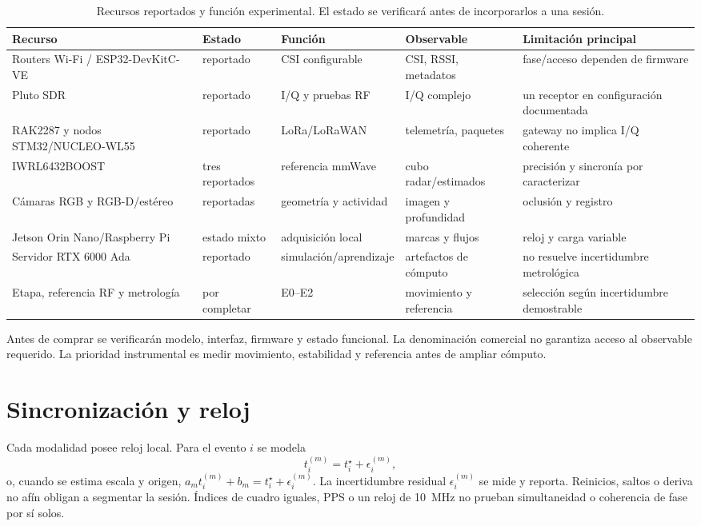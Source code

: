\begin{table}[htbp]
\centering\scriptsize
\caption{Recursos reportados y función experimental. El estado se verificará antes de incorporarlos a una sesión.}
\label{tab:platform_inventory}
\begin{tabularx}{\textwidth}{P{2.7cm}P{1.8cm}L P{2.5cm}L}
\toprule
Recurso & Estado & Función & Observable & Limitación principal\\
\midrule
Routers Wi-Fi / ESP32-DevKitC-VE & reportado & CSI configurable & CSI, RSSI, metadatos & fase/acceso dependen de firmware\\
Pluto SDR \citep{AnalogDevicesPluto} & reportado & I/Q y pruebas RF & I/Q complejo & un receptor en configuración documentada\\
RAK2287 y nodos STM32/NUCLEO-WL55 & reportado & LoRa/LoRaWAN & telemetría, paquetes & gateway no implica I/Q coherente\\
IWRL6432BOOST \citep{TIIWRL6432BOOST} & tres reportados & referencia mmWave & cubo radar/estimados & precisión y sincronía por caracterizar\\
Cámaras RGB y RGB-D/estéreo & reportadas & geometría y actividad & imagen y profundidad & oclusión y registro\\
Jetson Orin Nano/Raspberry Pi & estado mixto & adquisición local & marcas y flujos & reloj y carga variable\\
Servidor RTX 6000 Ada & reportado & simulación/aprendizaje & artefactos de cómputo & no resuelve incertidumbre metrológica\\
Etapa, referencia RF y metrología & por completar & E0--E2 & movimiento y referencia & selección según incertidumbre demostrable\\
\bottomrule
\end{tabularx}
\end{table}

Antes de comprar se verificarán modelo, interfaz, firmware y estado funcional. La denominación comercial no garantiza acceso al observable requerido. La prioridad instrumental es medir movimiento, estabilidad y referencia antes de ampliar cómputo.

\section{Sincronización y reloj}

Cada modalidad posee reloj local. Para el evento $i$ se modela
\begin{equation}
t_i^{(m)}=t_i^\star+\epsilon_i^{(m)},
\label{eq:multimodal_sync}
\end{equation}
o, cuando se estima escala y origen, $a_mt_i^{(m)}+b_m=t_i^\star+\epsilon_i^{(m)}$. La incertidumbre residual $\epsilon_i^{(m)}$ se mide y reporta. Reinicios, saltos o deriva no afín obligan a segmentar la sesión. Índices de cuadro iguales, PPS o un reloj de \SI{10}{MHz} no prueban simultaneidad o coherencia de fase por sí solos.

